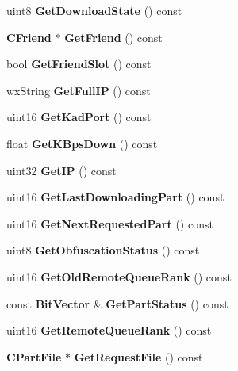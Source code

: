 \begin{DoxyCompactItemize}
\item 
uint8 {\bfseries GetDownloadState} () const \label{classCClientRef_ad64244f4d26c85db4f51b1463bfa4898}

\item 
{\bf CFriend} $\ast$ {\bfseries GetFriend} () const \label{classCClientRef_af04b9c8cf928423b15c0e908ed6225df}

\item 
bool {\bfseries GetFriendSlot} () const \label{classCClientRef_af335b65cd70e186b9b995ec210adc180}

\item 
wxString {\bfseries GetFullIP} () const \label{classCClientRef_a456c45fbe450e8c6b2e9bb8519b4525a}

\item 
uint16 {\bfseries GetKadPort} () const \label{classCClientRef_a46fa05e93fd0b459f0580945fefa6137}

\item 
float {\bfseries GetKBpsDown} () const \label{classCClientRef_aa0ae0132d2b56545d11364661662438a}

\item 
uint32 {\bfseries GetIP} () const \label{classCClientRef_ac875c51b38cdb6265b42a5683cbafbee}

\item 
uint16 {\bfseries GetLastDownloadingPart} () const \label{classCClientRef_a641df9ebf34a0e8188a57af3d2ba94db}

\item 
uint16 {\bfseries GetNextRequestedPart} () const \label{classCClientRef_ac534c0bcdfc0942683278889ab0f4136}

\item 
uint8 {\bfseries GetObfuscationStatus} () const \label{classCClientRef_a7ffda34a57e6500d9ec2ee70088400ac}

\item 
uint16 {\bfseries GetOldRemoteQueueRank} () const \label{classCClientRef_acdf33623a80d6a44f97f4de8a756b911}

\item 
const {\bf BitVector} \& {\bfseries GetPartStatus} () const \label{classCClientRef_ab4526bcfd902020f92f5c9c1933af3db}

\item 
uint16 {\bfseries GetRemoteQueueRank} () const \label{classCClientRef_a0400bb10bde5eb5602caec65d096f09e}

\item 
{\bf CPartFile} $\ast$ {\bfseries GetRequestFile} () const \label{classCClientRef_afa5a197225cb724b0ab60fa6b0da83a9}


\end{DoxyCompactItemize}
